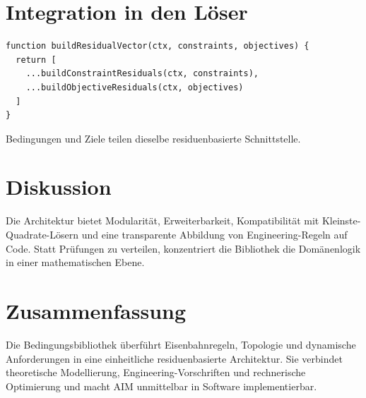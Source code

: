 \section{Integration in den Löser}
\begin{verbatim}
function buildResidualVector(ctx, constraints, objectives) {
  return [
    ...buildConstraintResiduals(ctx, constraints),
    ...buildObjectiveResiduals(ctx, objectives)
  ]
}
\end{verbatim}
Bedingungen und Ziele teilen dieselbe residuenbasierte Schnittstelle.

\section{Diskussion}
Die Architektur bietet Modularität, Erweiterbarkeit, Kompatibilität mit
Kleinste-Quadrate-Lösern und eine transparente Abbildung von Engineering-Regeln
auf Code. Statt Prüfungen zu verteilen, konzentriert die Bibliothek die
Domänenlogik in einer mathematischen Ebene.

\section{Zusammenfassung}
\begin{summary}
Die Bedingungsbibliothek überführt Eisenbahnregeln, Topologie und dynamische
Anforderungen in eine einheitliche residuenbasierte Architektur. Sie verbindet
theoretische Modellierung, Engineering-Vorschriften und rechnerische
Optimierung und macht AIM unmittelbar in Software implementierbar.
\end{summary}
